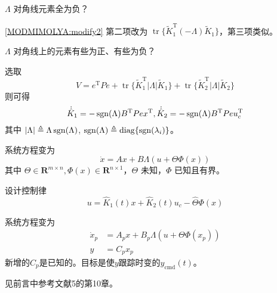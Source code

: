 \begin{problem}
    $\Lambda$ 对角线元素全为负？
\end{problem}
\begin{hint}
\eqref{MODMIMOLYA:modify2} 第二项改为 $\ensuremath{\operatorname{tr}} \{ \tilde{K}^\mathrm{T}_1 (- \Lambda) \tilde{K} _1 \}$，第三项类似。
\end{hint}
\begin{problem}
    $\Lambda$ 对角线上的元素有些为正、有些为负？
\end{problem}
\begin{hint}
    选取\[ V = e^\mathrm{T} P  e +\ensuremath{\operatorname{tr}} \{ \tilde{K}^\mathrm{T}_1 |
       \Lambda | \tilde{K} _1 \} +\ensuremath{\operatorname{tr}} \{
       \tilde{K}^\mathrm{T}_2 | \Lambda | \tilde{K} _2 \} \]
    则可得
    \[ \dot{\hat{K}} _1 = -\operatorname{sgn} (\Lambda) B^\mathrm{T}  P  e
       x^\mathrm{T}, \dot{\hat{K}} _2 = -\operatorname{sgn} (\Lambda) B^\mathrm{T}
       P  e  u^\mathrm{T}_c \]
    其中 $| \Lambda | \triangleq \Lambda \operatorname{sgn}
    (\Lambda)$, $\operatorname{sgn} (\Lambda) \triangleq
    \operatorname{diag} \{ \operatorname{sgn}
    (\lambda_i) \}$。
\end{hint}

\begin{problem}\label{Pro:uncertainty}
系统方程变为
  \begin{equation}
      \dot{x} = A  x + B \Lambda (u + \Theta\Phi (x))\label{Sys:MRAC:MIMO_with_dis}
  \end{equation}
  其中 $\Theta \in \mathbf{R}^{m \times n}, \Phi (x) \in \mathbf{R}^{n \times 1}$，$\Theta$ 未知，$\Phi$ 已知且有界。
\end{problem}
\begin{hint}
    设计控制律\[ u = \hat{K}_1 (t) x + \hat{K}_2 (t) u_c - \hat{\Theta}\Phi (x)  \]
\end{hint}
\begin{problem}
系统方程变为
  \begin{align*}
      \dot{x}_p &= A_p  x + B_p \Lambda (u + \Theta\Phi (x_p))\\
      y&=C_px_p
  \end{align*}
  新增的$C_p$是已知的。目标是使$y$跟踪时变的$y_{\mathrm{cmd}}(t)$。
\end{problem}
\begin{hint}
    见前言中参考文献5的第10章。
\end{hint}